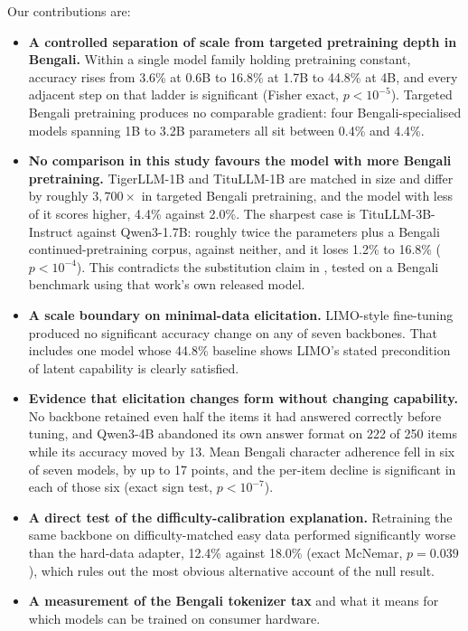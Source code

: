 Our contributions are:

\begin{itemize}
  \item \textbf{A controlled separation of scale from targeted pretraining
        depth in Bengali.} Within a single model family holding pretraining
        constant, accuracy rises from 3.6\% at 0.6B to 16.8\% at 1.7B to 44.8\%
        at 4B, and every adjacent step on that ladder is significant (Fisher
        exact, $p < 10^{-5}$). Targeted Bengali pretraining produces no
        comparable gradient: four Bengali-specialised models spanning 1B to
        3.2B parameters all sit between 0.4\% and 4.4\%.
  \item \textbf{No comparison in this study favours the model with more
        Bengali pretraining.} TigerLLM-1B and TituLLM-1B are matched in size
        and differ by roughly $3{,}700\times$ in targeted Bengali pretraining,
        and the model with less of it scores higher, 4.4\% against 2.0\%. The
        sharpest case is TituLLM-3B-Instruct against Qwen3-1.7B: roughly twice
        the parameters plus a Bengali continued-pretraining corpus, against
        neither, and it loses 1.2\% to 16.8\% ($p < 10^{-4}$). This contradicts
        the substitution claim in \parencite{raihan2025tigerllm}, tested on a
        Bengali benchmark using that work's own released model.
  \item \textbf{A scale boundary on minimal-data elicitation.} LIMO-style
        fine-tuning produced no significant accuracy change on any of seven
        backbones. That includes one model whose 44.8\% baseline shows LIMO's
        stated precondition of latent capability is clearly satisfied.
  \item \textbf{Evidence that elicitation changes form without changing
        capability.} No backbone retained even half the items it had answered
        correctly before tuning, and Qwen3-4B abandoned its own answer format
        on 222 of 250 items while its accuracy moved by 13. Mean Bengali
        character adherence fell in six of seven models, by up to 17 points,
        and the per-item decline is significant in each of those six (exact
        sign test, $p < 10^{-7}$).
  \item \textbf{A direct test of the difficulty-calibration explanation.}
        Retraining the same backbone on difficulty-matched easy data performed
        significantly worse than the hard-data adapter, 12.4\% against 18.0\%
        (exact McNemar, $p = 0.039$), which rules out the most obvious
        alternative account of the null result.
  \item \textbf{A measurement of the Bengali tokenizer tax} and what it means
        for which models can be trained on consumer hardware.
\end{itemize}

